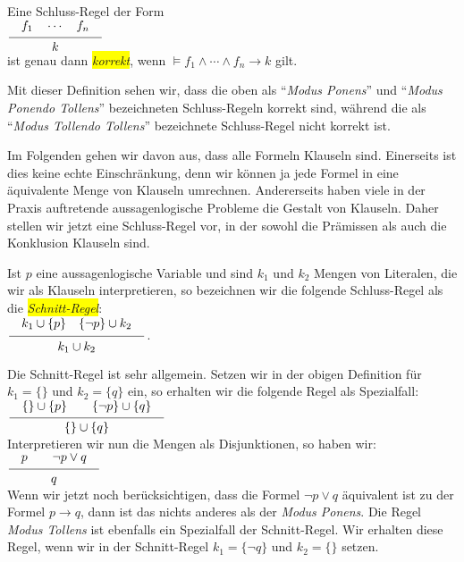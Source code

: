 \begin{Definition}
  Eine Schluss-Regel der Form \\[0.2cm]
  \hspace*{1.3cm} $\schluss{f_1 \quad \cdots \quad f_n}{k}$ \\[0.2cm]
  ist genau dann \colorbox{yellow}{\emph{korrekt}}, wenn 
  $\models f_1 \wedge \cdots \wedge f_n \rightarrow k$ gilt. \eox
\end{Definition}
Mit dieser Definition sehen wir, dass 
die oben als ``\emph{Modus Ponens}'' und ``\emph{Modus Ponendo Tollens}'' bezeichneten
Schluss-Regeln korrekt sind, w\"{a}hrend die als  ``\emph{Modus Tollendo Tollens}'' bezeichnete
Schluss-Regel nicht korrekt ist.

Im Folgenden gehen wir davon aus, dass alle Formeln Klauseln sind.  Einerseits ist dies
keine echte Einschr\"{a}nkung, denn wir k\"{o}nnen ja jede Formel in eine \"{a}quivalente Menge von
Klauseln umrechnen.  Andererseits haben viele in der Praxis auftretende aussagenlogische
Probleme die Gestalt von Klauseln.  Daher stellen wir jetzt eine Schluss-Regel vor, in der
sowohl die Pr\"{a}missen als auch die Konklusion Klauseln sind.
     
\begin{Definition}
    Ist $p$ eine aussagenlogische Variable und sind $k_1$ und $k_2$ Mengen von Literalen,
    die wir als Klauseln interpretieren, so bezeichnen wir die folgende Schluss-Regel
    als die \colorbox{yellow}{\emph{Schnitt-Regel}}: 
    \\[0.2cm]
    \hspace*{1.3cm}
    $\displaystyle \schluss{ k_1 \cup \{p\} \quad \{\neg p\} \cup k_2 }{k_1 \cup k_2}$. 
    \eox
\end{Definition}

\noindent
Die Schnitt-Regel ist sehr allgemein.  Setzen wir in der obigen Definition f\"{u}r $k_1 =
\{\}$ und  $k_2 = \{q\}$ 
ein, so erhalten wir die folgende Regel als Spezialfall: \\[0.2cm]
\hspace*{1.3cm} $\schluss{\{\} \cup \{p\} \quad\quad \{\neg p\} \cup \{ q \} }{ \{\} \cup \{q\} }$ \\[0.2cm]
Interpretieren wir nun die Mengen als Disjunktionen, so haben wir: \\[0.2cm]
\hspace*{1.3cm}  $\schluss{p \quad\quad \neg p \vee q }{ q }$ \\[0.2cm]
Wenn wir jetzt noch ber\"{u}cksichtigen, dass die Formel $\neg p \vee q$ \"{a}quivalent ist zu der
Formel $p \rightarrow q$, dann ist das nichts anderes als der \emph{Modus Ponens}.  
Die Regel \emph{Modus Tollens} ist ebenfalls ein Spezialfall der Schnitt-Regel.  Wir
erhalten diese Regel, wenn wir in der Schnitt-Regel $k_1 = \{ \neg q \}$ und $k_2 = \{\}$ setzen.

